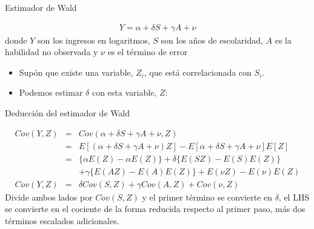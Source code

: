 \documentclass{beamer}
\begin{document}
\begin{frame}{Estimador de Wald}

\begin{eqnarray*}
Y = \alpha + \delta S + \gamma A + \nu
\end{eqnarray*}
donde $Y$ son los ingresos en logaritmos, $S$ son los años de escolaridad, $A$ es la habilidad no observada y $\nu$ es el término de error

\begin{itemize}
    \item Supón que existe una variable, $Z_i$, que está correlacionada con $S_i$.
    \item Podemos estimar $\delta$ con esta variable, $Z$:
\end{itemize}

\end{frame}


\begin{frame}{Deducción del estimador de Wald}
    
    \begin{eqnarray*}
    Cov(Y,Z) 	&=& Cov(\alpha + \delta{S} + \gamma{A} + \nu, Z) \\
            &=&	E[(\alpha + \delta{S} + \gamma{A} + \nu)  Z] - E[\alpha + \delta{S} + \gamma{A} + \nu]E[Z] \\
            &=& \{\alpha E(Z) - \alpha E(Z) \} + \delta \{ E(SZ) - E(S)E(Z)\} \\
            && + \gamma \{E(AZ) - E(A)E(Z) \} + E(\nu Z) - E(\nu)E(Z) \\
    Cov(Y,Z)	&=& \delta Cov(S,Z) + \gamma Cov(A,Z) + Cov(\nu,Z)
    \end{eqnarray*}
    Divide ambos lados por $Cov(S,Z)$ y el primer término se convierte en $\delta$, el LHS se convierte en el cociente de la forma reducida respecto al primer paso, más dos términos escalados adicionales.
\end{frame}
\end{document}
